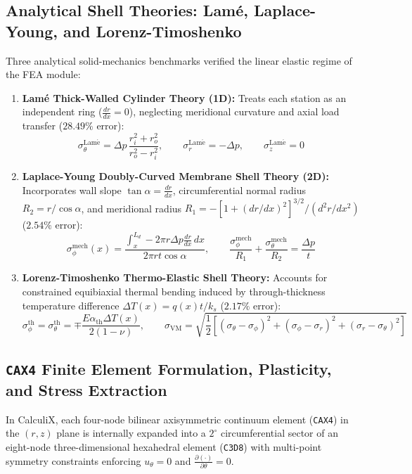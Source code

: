 \documentclass[11pt,a4paper]{article}
\begin{document}
\subsection{Analytical Shell Theories: Lam\'e, Laplace-Young, and Lorenz-Timoshenko}
Three analytical solid-mechanics benchmarks verified the linear elastic regime of the FEA module:
\begin{enumerate}
    \item \textbf{Lam\'e Thick-Walled Cylinder Theory (1D):} Treats each station as an independent ring ($\frac{dr}{dx} = 0$), neglecting meridional curvature and axial load transfer ($28.49\%$ error):
    \begin{equation}
    \sigma_\theta^{\mathrm{Lam\acute{e}}} = \Delta p \, \frac{r_i^2 + r_o^2}{r_o^2 - r_i^2}, \qquad \sigma_r^{\mathrm{Lam\acute{e}}} = -\Delta p, \qquad \sigma_z^{\mathrm{Lam\acute{e}}} = 0
    \end{equation}
    \item \textbf{Laplace-Young Doubly-Curved Membrane Shell Theory (2D):} Incorporates wall slope $\tan\alpha = \frac{dr}{dx}$, circumferential normal radius $R_2 = r/\cos\alpha$, and meridional radius $R_1 = -\left[1 + (dr/dx)^2\right]^{3/2} / (d^2r/dx^2)$ ($2.54\%$ error):
    \begin{equation}
    \sigma_\phi^{\mathrm{mech}}(x) = \frac{\int_{x}^{L_d} -2\pi r \Delta p \frac{dr}{dx}\,dx}{2\pi r t \cos\alpha}, \qquad \frac{\sigma_\phi^{\mathrm{mech}}}{R_1} + \frac{\sigma_\theta^{\mathrm{mech}}}{R_2} = \frac{\Delta p}{t}
    \end{equation}
    \item \textbf{Lorenz-Timoshenko Thermo-Elastic Shell Theory:} Accounts for constrained equibiaxial thermal bending induced by through-thickness temperature difference $\Delta T(x) = q(x) t / k_s$ ($2.17\%$ error):
    \begin{equation}
    \sigma_\phi^{\mathrm{th}} = \sigma_\theta^{\mathrm{th}} = \mp \frac{E \alpha_{\mathrm{th}} \Delta T(x)}{2(1 - \nu)}, \qquad
    \sigma_{\mathrm{VM}} = \sqrt{\frac{1}{2} \left[ (\sigma_\theta - \sigma_\phi)^2 + (\sigma_\phi - \sigma_r)^2 + (\sigma_r - \sigma_\theta)^2 \right]}
    \end{equation}
\end{enumerate}

\subsection{\texttt{CAX4} Finite Element Formulation, Plasticity, and Stress Extraction}
In CalculiX, each four-node bilinear axisymmetric continuum element (\texttt{CAX4}) in the $(r, z)$ plane is internally expanded into a $2^\circ$ circumferential sector of an eight-node three-dimensional hexahedral element (\texttt{C3D8}) with multi-point symmetry constraints enforcing $u_\theta = 0$ and $\frac{\partial(\cdot)}{\partial \theta} = 0$.
\end{document}
